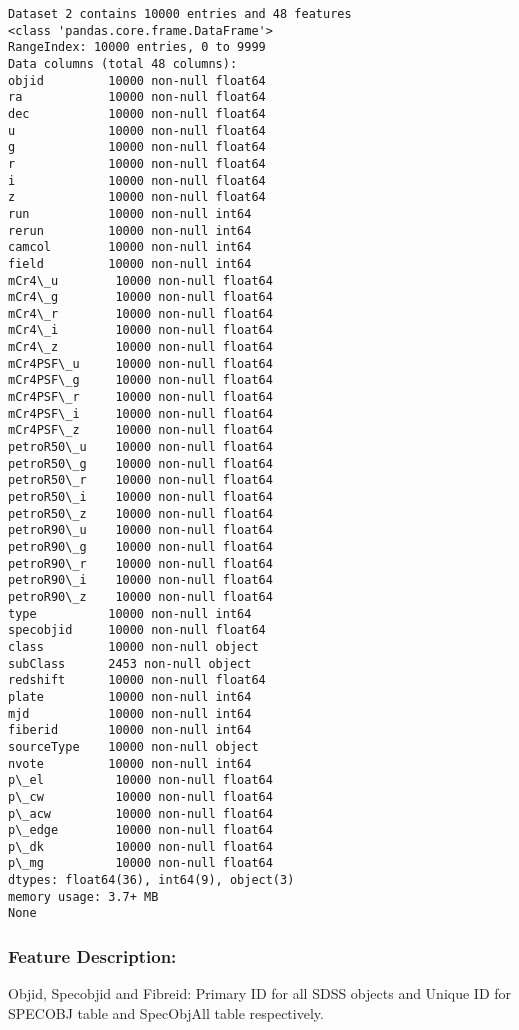 \documentclass[11pt]{article}
\begin{document}
    \begin{Verbatim}[commandchars=\\\{\}]
Dataset 2 contains 10000 entries and 48 features
<class 'pandas.core.frame.DataFrame'>
RangeIndex: 10000 entries, 0 to 9999
Data columns (total 48 columns):
objid         10000 non-null float64
ra            10000 non-null float64
dec           10000 non-null float64
u             10000 non-null float64
g             10000 non-null float64
r             10000 non-null float64
i             10000 non-null float64
z             10000 non-null float64
run           10000 non-null int64
rerun         10000 non-null int64
camcol        10000 non-null int64
field         10000 non-null int64
mCr4\_u        10000 non-null float64
mCr4\_g        10000 non-null float64
mCr4\_r        10000 non-null float64
mCr4\_i        10000 non-null float64
mCr4\_z        10000 non-null float64
mCr4PSF\_u     10000 non-null float64
mCr4PSF\_g     10000 non-null float64
mCr4PSF\_r     10000 non-null float64
mCr4PSF\_i     10000 non-null float64
mCr4PSF\_z     10000 non-null float64
petroR50\_u    10000 non-null float64
petroR50\_g    10000 non-null float64
petroR50\_r    10000 non-null float64
petroR50\_i    10000 non-null float64
petroR50\_z    10000 non-null float64
petroR90\_u    10000 non-null float64
petroR90\_g    10000 non-null float64
petroR90\_r    10000 non-null float64
petroR90\_i    10000 non-null float64
petroR90\_z    10000 non-null float64
type          10000 non-null int64
specobjid     10000 non-null float64
class         10000 non-null object
subClass      2453 non-null object
redshift      10000 non-null float64
plate         10000 non-null int64
mjd           10000 non-null int64
fiberid       10000 non-null int64
sourceType    10000 non-null object
nvote         10000 non-null int64
p\_el          10000 non-null float64
p\_cw          10000 non-null float64
p\_acw         10000 non-null float64
p\_edge        10000 non-null float64
p\_dk          10000 non-null float64
p\_mg          10000 non-null float64
dtypes: float64(36), int64(9), object(3)
memory usage: 3.7+ MB
None

    \end{Verbatim}

    \subsubsection{Feature Description:}\label{feature-description}

Objid, Specobjid and Fibreid: Primary ID for all SDSS objects and Unique
ID for SPECOBJ table and SpecObjAll table respectively.
\end{document}
